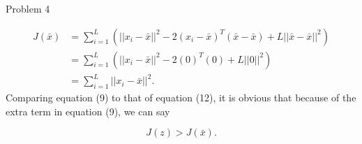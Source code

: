 \begin{problem}{Problem 4}
\begin{Highlight}
        \begin{align}
            J(\bar{x}) & = \sum^{L}_{i = 1} (||x_{i} - \bar{x}||^{2} - 2(x_{i} - \bar{x})^{T}(\bar{x} - \bar{x}) + L||\bar{x} - \bar{x}||^{2}) \\
            & = \sum^{L}_{i = 1} (||x_{i} - \bar{x}||^{2} - 2(0)^{T}(0) + L||0||^{2}) \\
            & = \sum^{L}_{i = 1} ||x_{i} - \bar{x}||^{2}.
        \end{align}
        Comparing equation (9) to that of equation (12), it is obvious that because of the extra term in equation (9), we can say

        \begin{equation}
            J(z) > J(\bar{x}).
        \end{equation}
    \end{Highlight}
\end{problem}

